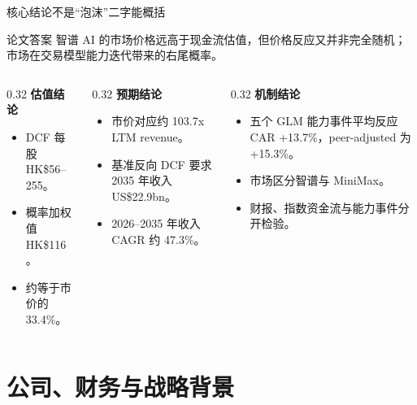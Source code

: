 \documentclass[aspectratio=169,11pt]{beamer}
\begin{document}
\begin{frame}{核心结论不是“泡沫”二字能概括}
  \begin{block}{论文答案}
    智谱 AI 的市场价格远高于现金流估值，但价格反应又并非完全随机；市场在交易模型能力迭代带来的右尾概率。
  \end{block}
  \vspace{0.4em}
  \begin{columns}[T,onlytextwidth]
    \begin{column}{0.32\textwidth}
      \textbf{估值结论}
      \begin{itemize}
        \item DCF 每股 HK\$56--255。
        \item 概率加权值 HK\$116。
        \item 约等于市价的 33.4\%。
      \end{itemize}
    \end{column}
    \begin{column}{0.32\textwidth}
      \textbf{预期结论}
      \begin{itemize}
        \item 市价对应约 103.7x LTM revenue。
        \item 基准反向 DCF 要求 2035 年收入 US\$22.9bn。
        \item 2026--2035 年收入 CAGR 约 47.3\%。
      \end{itemize}
    \end{column}
    \begin{column}{0.32\textwidth}
      \textbf{机制结论}
      \begin{itemize}
        \item 五个 GLM 能力事件平均反应 CAR +13.7\%，peer-adjusted 为 +15.3\%。
        \item 市场区分智谱与 MiniMax。
        \item 财报、指数资金流与能力事件分开检验。
      \end{itemize}
    \end{column}
  \end{columns}
\end{frame}

\section{公司、财务与战略背景}
\end{document}
